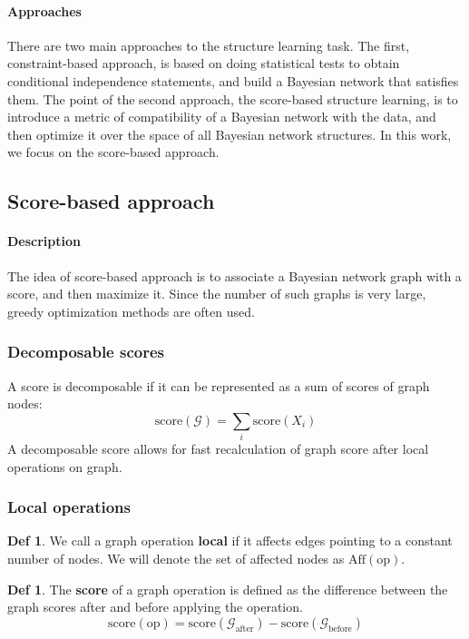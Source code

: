 \documentclass{article}
\newcommand{\score}[1]{
	\textrm{score}(#1)
}
\newcommand{\affnodes}[1]{
	\textrm{Aff}(#1)	
}
\newcommand{\graph}[1]{
	\mathcal{#1}
}
\begin{document}
\paragraph{Approaches} There are two main approaches to the structure learning task. The first, constraint-based approach, is based on doing statistical tests to obtain conditional independence statements, and build a Bayesian network that satisfies them. The point of the second approach, the score-based structure learning, is to introduce a metric of compatibility of a Bayesian network with the data, and then optimize it over the space of all Bayesian network structures. In this work, we focus on the score-based approach.

\subsection{Score-based approach}
\paragraph{Description} The idea of score-based approach is to associate a Bayesian network graph with a score, and then maximize it. Since the number of such graphs is very large, greedy optimization methods are often used.
\subsubsection{Decomposable scores}
A score is decomposable if it can be represented as a sum of scores of graph nodes: $$ \score{\graph{G}} = \sum_i{\score{X_i}} $$
A decomposable score allows for fast recalculation of graph score after local operations on graph. 
\subsubsection{Local operations}

\theoremstyle{definition}
\newtheorem*{local.operation}{Def}
\begin{local.operation}
	We call a graph operation \textbf{local} if it affects edges pointing to a constant number of nodes. We will denote the set of affected nodes as $\affnodes{\textrm{op}}$.
\end{local.operation}

\theoremstyle{definition}
\newtheorem*{operation.score}{Def}
\begin{operation.score}
	The \textbf{score} of a graph operation is defined as the difference between the graph scores after and before applying the operation.
	$$ \score{\textrm{op}} = \score{\graph{G}_{\textrm{after}}} - \score{\graph{G}_{\textrm{before}}} $$
\end{operation.score}
\end{document}

